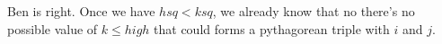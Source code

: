 \documentclass[a4paper,12pt]{article}
\begin{document}
Ben is right.  Once we have $hsq < ksq$,  we already know that no
there's no possible value of $k \le high$ that could forms a
pythagorean triple with $i$ and $j$.
\end{document}
